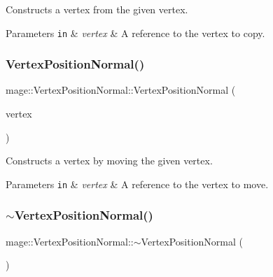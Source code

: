 Constructs a vertex from the given vertex.


\begin{DoxyParams}[1]{Parameters}
\mbox{\tt in}  & {\em vertex} & A reference to the vertex to copy. \\
\hline
\end{DoxyParams}
\hypertarget{structmage_1_1_vertex_position_normal_a23ca5ed9238a02837b44b97c5248dc12}{}\label{structmage_1_1_vertex_position_normal_a23ca5ed9238a02837b44b97c5248dc12} 
\subsubsection{\texorpdfstring{Vertex\+Position\+Normal()}{VertexPositionNormal()}\hspace{0.1cm}{\footnotesize\ttfamily [4/4]}}
{\footnotesize\ttfamily mage\+::\+Vertex\+Position\+Normal\+::\+Vertex\+Position\+Normal (\begin{DoxyParamCaption}\item[{\hyperlink{structmage_1_1_vertex_position_normal}{Vertex\+Position\+Normal} \&\&}]{vertex }\end{DoxyParamCaption})\hspace{0.3cm}{\ttfamily [default]}}

Constructs a vertex by moving the given vertex.


\begin{DoxyParams}[1]{Parameters}
\mbox{\tt in}  & {\em vertex} & A reference to the vertex to move. \\
\hline
\end{DoxyParams}
\hypertarget{structmage_1_1_vertex_position_normal_a664123217b7e8d18769ea46fc318e0c1}{}\label{structmage_1_1_vertex_position_normal_a664123217b7e8d18769ea46fc318e0c1} 
\subsubsection{\texorpdfstring{$\sim$\+Vertex\+Position\+Normal()}{~VertexPositionNormal()}}
{\footnotesize\ttfamily mage\+::\+Vertex\+Position\+Normal\+::$\sim$\+Vertex\+Position\+Normal (\begin{DoxyParamCaption}{ }\end{DoxyParamCaption})\hspace{0.3cm}{\ttfamily [default]}}

